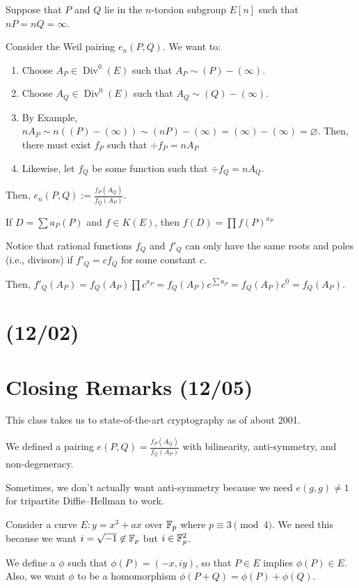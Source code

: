 \documentclass[notes]{agony}
\newcommand{\Div}{\operatorname{Div}}
\begin{document}
Suppose that $P$ and $Q$ lie in the $n$-torsion subgroup $E[n]$
such that $nP = nQ = \infty$.

Consider the Weil pairing $e_n(P,Q)$. We want to:
\begin{enumerate}[1.]
  \item Choose $A_P \in \Div^0(E)$ such that $A_P \sim (P) - (\infty)$.
  \item Choose $A_Q \in \Div^0(E)$ such that $A_Q \sim (Q) - (\infty)$.
  \item By Example, $nA_P \sim n((P) - (\infty)) \sim (nP) - (\infty) = (\infty) - (\infty) = \varnothing$.
        Then, there must exist $f_P$ such that $\div f_P = nA_P$
  \item Likewise, let $f_Q$ be some function such that $\div f_Q = nA_Q$.
\end{enumerate}
Then, $e_n(P,Q) := \frac{f_P(A_Q)}{f_Q(A_P)}$.

\begin{defn}
  If $D = \sum a_P(P)$ and $f \in K(E)$, then $f(D) = \prod f(P)^{a_P}$
\end{defn}

Notice that rational functions $f_Q$ and $f'_Q$
can only have the same roots and poles (i.e., divisors)
if $f'_Q = cf_Q$ for some constant $c$.

Then, $f'_Q(A_P) = f_Q(A_P)\prod c^{a_P}
  = f_Q(A_P) c^{\sum a_P} = f_Q(A_P) c^0 = f_Q(A_P)$.

\section{(12/02)}

\section{Closing Remarks (12/05)}

This class takes us to state-of-the-art cryptography as of about 2001.

We defined a pairing $e(P, Q) = \frac{f_P(A_Q)}{f_Q(A_P)}$
with bilinearity, anti-symmetry, and non-degeneracy.

Sometimes, we don't actually want anti-symmetry because we need
$e(g,g) \neq 1$ for tripartite Diffie--Hellman to work.

Consider a curve $E : y = x^3 + ax$ over $\mathbb{F}_p$ where $p \equiv 3 \pmod 4$.
We need this because we want $i = \sqrt{-1} \not\in \mathbb{F}_p$ but $i \in \mathbb{F}_p^2$.

We define a $\phi$ such that $\phi(P) = (-x,iy)$, so that $P \in E$ implies $\phi(P) \in E$.
Also, we want $\phi$ to be a homomorphism $\phi(P+Q) = \phi(P)+\phi(Q)$.
\end{document}

